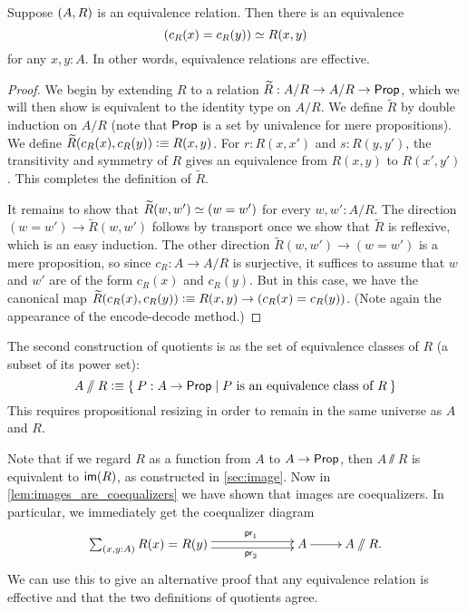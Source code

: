 \begin{lem}\label{lem:sets_exact}
Suppose ${\mathopen{}(A,R)\mathclose{}}$ is an equivalence relation. Then there is an equivalence
\begin{equation*}
(c_R(x)= c_R(y))\simeq R(x,y)
\end{equation*}
for any $x,y:A$. In other words, equivalence relations are effective.
\end{lem}

\begin{proof}
We begin by extending $R$ to a relation $\widetilde{R}:A/R\to A/R\to\mathsf{Prop}$, which we will then show is equivalent
to the identity type on $A/R$. We define $\widetilde{R}$ by double induction on
$A/R$ (note that $\mathsf{Prop}$ is a set by univalence for mere propositions). We
define $\widetilde{R}(c_R(x),c_R(y)) \vcentcolon\equiv R(x,y)$. For $r:R(x,x')$ and $s:R(y,y')$,
the transitivity and symmetry 
of $R$ gives an equivalence from $R(x,y)$ to $R(x',y')$. This completes the
definition of $\widetilde{R}$.

It remains to show that $\widetilde{R}(w,w')\simeq (w= w')$ for every $w,w':A/R$.
The direction $(w=w')\to \widetilde{R}(w,w')$ follows by transport once we show that $\widetilde{R}$ is reflexive, which is an easy induction.
The other direction $\widetilde{R}(w,w')\to (w= w')$ is a mere proposition, so since $c_R:A\to A/R$ is surjective, it suffices to assume that $w$ and $w'$ are of the form $c_R(x)$ and $c_R(y)$.
But in this case, we have the canonical map $\widetilde{R}(c_R(x),c_R(y)) \vcentcolon\equiv R(x,y) \to (c_R(x)=c_R(y))$.
(Note again the appearance of the encode-decode method.)
\end{proof}

The second construction of quotients is as the set of equivalence classes of $R$ (a subset
of its power set):
\[ A\sslash R \defeq \setof{ P:A\to\prop | P \text{ is an equivalence class of } R} \]
This requires propositional resizing in order to remain in the same universe as $A$ and $R$.

Note that if we regard $R$ as a function from $A$ to $A\to \mathsf{Prop}$, then $A\sslash R$ is equivalent to $\mathsf{im}(R)$, as constructed in \autoref{sec:image}.
Now in \autoref{lem:images_are_coequalizers} we have shown that images are
coequalizers. In particular, we immediately get the coequalizer diagram
\begin{equation*}
  \xymatrix{
    **[l]{\sm{x,y:A} R (x)= R (y)}
    \ar@<0.25em>[r]^{\proj1}
    \ar@<-0.25em>[r]_{\proj2}
    &
    {A}
    \ar[r]
    &
    {A \sslash R.}
  }
\end{equation*}
We can use this to give an alternative proof that any equivalence relation is effective and that the two definitions of quotients agree.


